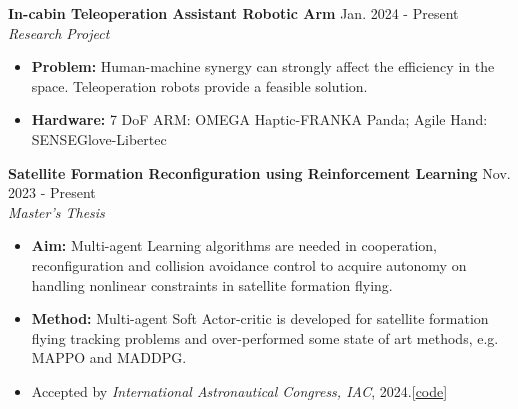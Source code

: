 \documentclass[11pt, a4paper]{article}
\begin{document}
\begin{researchitem}
    \item \textbf{In-cabin Teleoperation Assistant Robotic Arm} \hfill Jan. 2024 - Present \\
    \textit{Research Project}
    \begin{itemize}[noitemsep, topsep=0pt]
        \item \textbf{Problem:} Human-machine synergy  can strongly affect the efficiency in the space. Teleoperation robots provide a feasible solution.  
        \item \textbf{Hardware:} 7 DoF ARM: OMEGA Haptic-FRANKA Panda; Agile Hand: SENSEGlove-Libertec
    \end{itemize}
\end{researchitem}

\begin{researchitem}
    \item \textbf{Satellite Formation Reconfiguration using Reinforcement Learning} \hfill Nov. 2023 - Present \\
    \textit{Master’s Thesis}
    \begin{itemize}[noitemsep, topsep=0pt]
        \item \textbf{Aim:} Multi-agent Learning algorithms are needed in cooperation, reconfiguration and collision avoidance control to acquire autonomy on handling nonlinear constraints in satellite formation flying. 
        \item \textbf{Method:} Multi-agent Soft Actor-critic is developed for satellite formation flying tracking problems and over-performed some state of art methods, e.g. MAPPO and MADDPG. 
        \item Accepted by \textit{International Astronautical Congress, IAC}, 2024.[\href{https://github.com/ZCen-Xiong/Multi-Agent-SAC-Formation-Flying}{code}]
    \end{itemize}
\end{researchitem}
\end{document}
